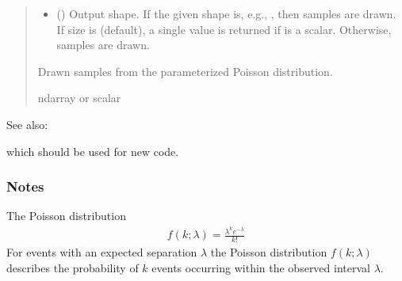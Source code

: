 \documentclass[letterpaper,10pt,english]{sphinxmanual}
\begin{document}
\begin{fulllineitems}
\begin{quote}
\begin{description}
\begin{itemize}
\item {} 
\sphinxAtStartPar
{} (\sphinxstyleliteralemphasis{\sphinxupquote{, }}) \textendash{} Output shape.  If the given shape is, e.g., , then
 samples are drawn.  If size is  (default),
a single value is returned if  is a scalar. Otherwise,
 samples are drawn.

\end{itemize}

\sphinxAtStartPar
{} \textendash{} Drawn samples from the parameterized Poisson distribution.

\sphinxAtStartPar
ndarray or scalar

\end{description}\end{quote}


\begin{sphinxseealso}{See also:}
\begin{description}
\sphinxAtStartPar
which should be used for new code.

\end{description}


\end{sphinxseealso}

\subsubsection*{Notes}

\sphinxAtStartPar
The Poisson distribution
\begin{equation*}
\begin{split}f(k; \lambda)=\frac{\lambda^k e^{-\lambda}}{k!}\end{split}
\end{equation*}
\sphinxAtStartPar
For events with an expected separation \(\lambda\) the Poisson
distribution \(f(k; \lambda)\) describes the probability of
\(k\) events occurring within the observed
interval \(\lambda\).


\end{fulllineitems}
\end{document}
